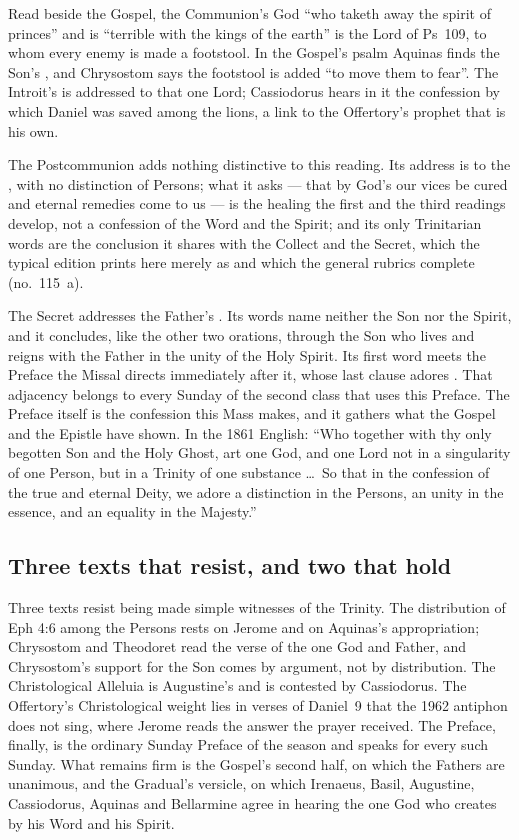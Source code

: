 Read beside the Gospel, the Communion's God ``who taketh away the spirit of
princes'' and is ``terrible with the kings of the earth'' is the Lord of
Ps~109, to whom every enemy is made a footstool. In the Gospel's psalm Aquinas
finds the Son's , and Chrysostom says the
footstool is added ``to move them to fear''. The
Introit's  is addressed to that one Lord; Cassiodorus
hears in it the confession by which Daniel was saved among the lions, a link to
the Offertory's prophet that is his own.

The Postcommunion adds nothing distinctive to this reading. Its address is to
the , with no distinction of Persons; what it asks ---
that by God's  our vices be cured and eternal remedies
come to us --- is the healing the first and the third readings develop, not a
confession of the Word and the Spirit; and its only Trinitarian words are the
conclusion it shares with the Collect and the Secret, which the typical
edition prints here merely as  and which the general
rubrics complete (no.~115~a).

The Secret addresses the Father's . Its words name neither the
Son nor the Spirit, and it concludes, like the other two orations, through the
Son who lives and reigns with the Father in the unity of the Holy Spirit. Its
first word meets the Preface the Missal directs immediately after it, whose
last clause adores . That adjacency belongs
to every Sunday of the second class that uses this Preface. The Preface itself
is the confession this Mass makes, and it gathers what the Gospel and the
Epistle have shown. In the 1861 English: ``Who together with thy only begotten
Son and the Holy Ghost, art one God, and one Lord not in a singularity of one
Person, but in a Trinity of one substance \dots\ So that in the confession of
the true and eternal Deity, we adore a distinction in the Persons, an unity in
the essence, and an equality in the Majesty.''

\subsection{Three texts that resist, and two that hold}

Three texts resist being made simple witnesses of the Trinity. The
distribution of Eph 4:6 among the Persons rests on Jerome and on Aquinas's
appropriation; Chrysostom and Theodoret read the verse of the one God and
Father, and Chrysostom's support for the Son comes by argument, not by
distribution. The Christological Alleluia is Augustine's and is contested by
Cassiodorus. The Offertory's Christological weight lies in verses of Daniel~9 that the
1962 antiphon does not sing, where Jerome reads the answer the prayer
received. The Preface, finally, is the ordinary Sunday Preface of the season
and speaks for every such Sunday. What remains firm is the Gospel's second half,
on which the Fathers are unanimous, and the Gradual's versicle, on which
Irenaeus, Basil, Augustine, Cassiodorus, Aquinas and Bellarmine agree in
hearing the one God who creates by his Word and his Spirit.

